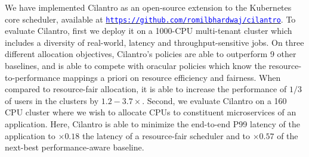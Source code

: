 
We have implemented Cilantro as an open-source extension to the Kubernetes core scheduler, available at \href{https://github.com/romilbhardwaj/cilantro}{\textcolor{blue}{\texttt{https://github.com/romilbhardwaj/cilantro}}}. To evaluate Cilantro, first we deploy it on a 1000-CPU multi-tenant cluster which includes a diversity of real-world, latency and throughput-sensitive jobs.
On three different allocation objectives, Cilantro's policies are able to outperform 9 other
baselines, and is able
to compete with oracular policies
which know the resource-to-performance mappings a priori on resource
efficiency and fairness.
When compared to resource-fair allocation, it is able to 
increase the performance of $1/3$ of users in the clusters by $1.2-3.7\times$.
Second, we evaluate Cilantro on a 160 CPU cluster where we wish to
allocate CPUs to constituent microservices of an 
application. Here, Cilantro is able to minimize the end-to-end P99
latency of the application to
$\times 0.18$ the latency of a resource-fair scheduler and to
$\times 0.57$ of the next-best performance-aware baseline.


